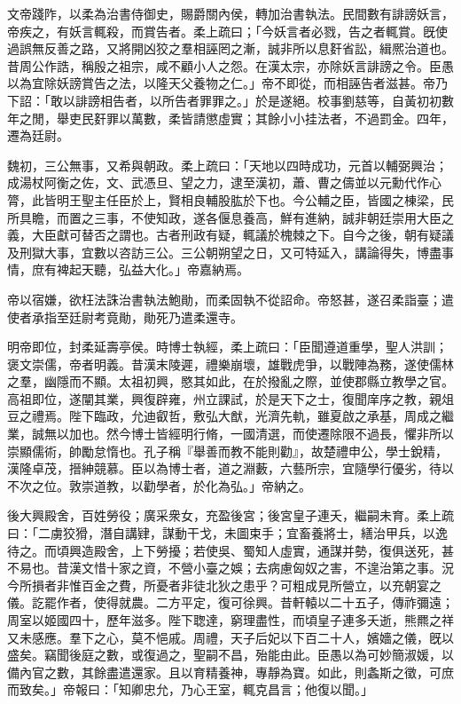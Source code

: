 \begin{pinyinscope}
 
 
 
 文帝踐阼，以柔為治書侍御史，賜爵關內侯，轉加治書執法。民間數有誹謗妖言，帝疾之，有妖言輒殺，而賞告者。柔上疏曰；「今妖言者必戮，告之者輒賞。旣使過誤無反善之路，又將開凶狡之羣相誣罔之漸，誠非所以息姧省訟，緝熈治道也。昔周公作誥，稱殷之祖宗，咸不顧小人之怨。在漢太宗，亦除妖言誹謗之令。臣愚以為宜除妖謗賞告之法，以隆天父養物之仁。」帝不即從，而相誣告者滋甚。帝乃下詔：「敢以誹謗相告者，以所告者罪罪之。」於是遂絕。校事劉慈等，自黃初初數年之閒，舉吏民姧罪以萬數，柔皆請懲虛實；其餘小小挂法者，不過罰金。四年，遷為廷尉。
 
 
 
 
 魏初，三公無事，又希與朝政。柔上疏曰：「天地以四時成功，元首以輔弼興治；成湯杖阿衡之佐，文、武憑旦、望之力，逮至漢初，蕭、曹之儔並以元勳代作心膂，此皆明王聖主任臣於上，賢相良輔股肱於下也。今公輔之臣，皆國之棟梁，民所具瞻，而置之三事，不使知政，遂各偃息養高，鮮有進納，誠非朝廷崇用大臣之義，大臣獻可替否之謂也。古者刑政有疑，輒議於槐棘之下。自今之後，朝有疑議及刑獄大事，宜數以咨訪三公。三公朝朔望之日，又可特延入，講論得失，博盡事情，庶有裨起天聽，弘益大化。」帝嘉納焉。
 
 
 
 
 帝以宿嫌，欲枉法誅治書執法鮑勛，而柔固執不從詔命。帝怒甚，遂召柔詣臺；遣使者承指至廷尉考竟勛，勛死乃遣柔還寺。
 
 
 
 
 明帝即位，封柔延壽亭侯。時博士執經，柔上疏曰：「臣聞遵道重學，聖人洪訓；褒文崇儒，帝者明義。昔漢末陵遲，禮樂崩壞，雄戰虎爭，以戰陣為務，遂使儒林之羣，幽隱而不顯。太祖初興，愍其如此，在於撥亂之際，並使郡縣立教學之官。高祖即位，遂闡其業，興復辟雍，州立課試，於是天下之士，復聞庠序之教，親俎豆之禮焉。陛下臨政，允迪叡哲，敷弘大猷，光濟先軌，雖夏啟之承基，周成之繼業，誠無以加也。然今博士皆經明行脩，一國清選，而使遷除限不過長，懼非所以崇顯儒術，帥勵怠惰也。孔子稱『舉善而教不能則勸』，故楚禮申公，學士銳精，漢隆卓茂，搢紳競慕。臣以為博士者，道之淵藪，六藝所宗，宜隨學行優劣，待以不次之位。敦崇道教，以勸學者，於化為弘。」帝納之。
 
 
 
 
 後大興殿舍，百姓勞役；廣采衆女，充盈後宮；後宮皇子連夭，繼嗣未育。柔上疏曰：「二虜狡猾，潛自講肄，謀動干戈，未圖束手；宜畜養將士，繕治甲兵，以逸待之。而頃興造殿舍，上下勞擾；若使吳、蜀知人虛實，通謀并勢，復俱送死，甚不易也。昔漢文惜十家之資，不營小臺之娛；去病慮匈奴之害，不遑治第之事。況今所損者非惟百金之費，所憂者非徒北狄之患乎？可粗成見所營立，以充朝宴之儀。訖罷作者，使得就農。二方平定，復可徐興。昔軒轅以二十五子，傳祚彌遠；周室以姬國四十，歷年滋多。陛下聦達，窮理盡性，而頃皇子連多夭逝，熊羆之祥又未感應。羣下之心，莫不悒戚。周禮，天子后妃以下百二十人，嬪嬙之儀，旣以盛矣。竊聞後庭之數，或復過之，聖嗣不昌，殆能由此。臣愚以為可妙簡淑媛，以備內官之數，其餘盡遣還家。且以育精養神，專靜為寶。如此，則螽斯之徵，可庶而致矣。」帝報曰：「知卿忠允，乃心王室，輒克昌言；他復以聞。」
 

\end{pinyinscope}
